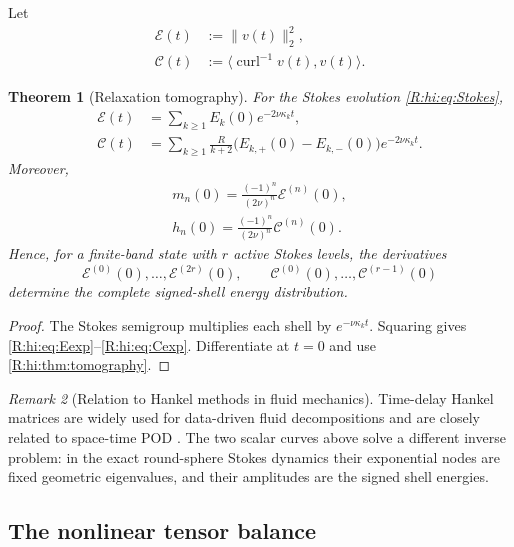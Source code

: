 \documentclass[
 aps,
 prd,
 reprint,
 amsmath,
 amssymb,
 nofootinbib,
 superscriptaddress
]{revtex4-2}
\newtheorem{theorem}{Theorem}[section]
\theoremstyle{definition}
\theoremstyle{remark}
\newtheorem{remark}[theorem]{Remark}
\newcommand{\curl}{\operatorname{curl}}
\begin{document}
Let
\begin{align}
 \mathcal E(t)
 &:=
 \|v(t)\|_2^2,
 \label{R:hi:eq:Etime}\\
 \mathcal C(t)
 &:=
 \langle\curl^{-1}v(t),v(t)\rangle.
 \label{R:hi:eq:Ctime}
\end{align}

\begin{theorem}[Relaxation tomography]
\label{R:hi:thm:relaxationtomography}
For the Stokes evolution \eqref{R:hi:eq:Stokes},
\begin{align}
 \mathcal E(t)
 &=
 \sum_{k\ge1}
 E_k(0)e^{-2\nu\kappa_kt},
 \label{R:hi:eq:Eexp}\\
 \mathcal C(t)
 &=
 \sum_{k\ge1}
 \frac{R}{k+2}
 \bigl(E_{k,+}(0)-E_{k,-}(0)\bigr)
 e^{-2\nu\kappa_kt}.
 \label{R:hi:eq:Cexp}
\end{align}
Moreover,
\begin{align}
 \boxed{
 m_n(0)
 =
 \frac{(-1)^n}{(2\nu)^n}
 \mathcal E^{(n)}(0),
 }
 \label{R:hi:eq:mfromE}\\
 \boxed{
 h_n(0)
 =
 \frac{(-1)^n}{(2\nu)^n}
 \mathcal C^{(n)}(0).
 }
 \label{R:hi:eq:hfromC}
\end{align}
Hence, for a finite-band state with $r$ active Stokes levels, the derivatives
\[
 \mathcal E^{(0)}(0),\ldots,\mathcal E^{(2r)}(0),
 \qquad
 \mathcal C^{(0)}(0),\ldots,\mathcal C^{(r-1)}(0)
\]
determine the complete signed-shell energy distribution.
\end{theorem}

\begin{proof}
The Stokes semigroup multiplies each shell by
$e^{-\nu\kappa_kt}$.  Squaring gives
\eqref{R:hi:eq:Eexp}--\eqref{R:hi:eq:Cexp}.  Differentiate at $t=0$ and use
\cref{R:hi:thm:tomography}.
\end{proof}

\begin{remark}[Relation to Hankel methods in fluid mechanics]
Time-delay Hankel matrices are widely used for data-driven fluid
decompositions and are closely related to space-time POD
\cite{FrameTowne2023}.  The two scalar curves above solve a different
inverse problem: in the exact round-sphere Stokes dynamics their exponential
nodes are fixed geometric eigenvalues, and their amplitudes are the signed
shell energies.
\end{remark}

\subsection{The nonlinear tensor balance}
\end{document}
